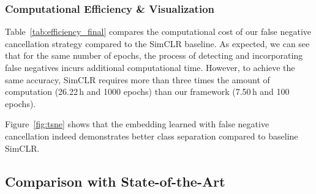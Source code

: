 \documentclass[10pt,twocolumn,letterpaper]{article}
\begin{document}
\vspace{-5pt}
\subsubsection{Computational Efficiency \& Visualization}


Table~\ref{tab:efficiency_final} compares the computational cost of our false negative cancellation strategy compared to the SimCLR baseline. As expected, we can see that for the same number of epochs, the process of detecting and incorporating false negatives incurs additional computational time. However, to achieve the same accuracy, SimCLR requires more than three times the amount of computation (26.22\,h and 1000 epochs) than our framework (7.50\,h and 100 epochs).

Figure~\ref{fig:tsne} shows that the embedding learned with false negative cancellation indeed demonstrates better class separation compared to baseline SimCLR.


\subsection{Comparison with State-of-the-Art}
\end{document}
